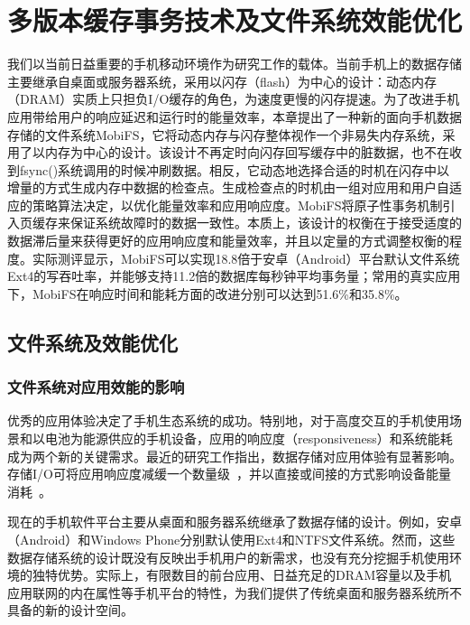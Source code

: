 \chapter{多版本缓存事务技术及文件系统效能优化}
\label{chap:vct}

我们以当前日益重要的手机移动环境作为研究工作的载体。当前手机上的数据存储主要继承自桌面或服务器系统，采用以闪存（flash）为中心的设计：动态内存（DRAM）实质上只担负I/O缓存的角色，为速度更慢的闪存提速。为了改进手机应用带给用户的响应延迟和运行时的能量效率，本章提出了一种新的面向手机数据存储的文件系统MobiFS，它将动态内存与闪存整体视作一个非易失内存系统，采用了以内存为中心的设计。该设计不再定时向闪存回写缓存中的脏数据，也不在收到fsync()系统调用的时候冲刷数据。相反，它动态地选择合适的时机在闪存中以增量的方式生成内存中数据的检查点。生成检查点的时机由一组对应用和用户自适应的策略算法决定，以优化能量效率和应用响应度。MobiFS将原子性事务机制引入页缓存来保证系统故障时的数据一致性。本质上，该设计的权衡在于接受适度的数据滞后量来获得更好的应用响应度和能量效率，并且以定量的方式调整权衡的程度。实际测评显示，MobiFS可以实现18.8倍于安卓（Android）平台默认文件系统Ext4的写吞吐率，并能够支持11.2倍的数据库每秒钟平均事务量；常用的真实应用下，MobiFS在响应时间和能耗方面的改进分别可以达到51.6\%和35.8\%。

\section{文件系统及效能优化}

\subsection{文件系统对应用效能的影响}

优秀的应用体验决定了手机生态系统的成功。特别地，对于高度交互的手机使用场景和以电池为能源供应的手机设备，应用的响应度（responsiveness）和系统能耗成为两个新的关键需求。最近的研究工作指出，数据存储对应用体验有显著影响。存储I/O可将应用响应度减缓一个数量级~\cite{Desnoyers:2013:SRN:2534861.2534867, Kim:RSS:2012,Lee:2012:SLD:2380356.2380367, Nguyen:2014:ISR:2638728.2638841}，并以直接或间接的方式影响设备能量消耗~\cite{Li:2014:EOM:2591305.2591316,Nguyen:2013:SSE:2493432.2493505,
Xu:2013:OBE:2462456.2464444}。

现在的手机软件平台主要从桌面和服务器系统继承了数据存储的设计。例如，安卓（Android）和Windows Phone分别默认使用Ext4和NTFS文件系统。然而，这些数据存储系统的设计既没有反映出手机用户的新需求，也没有充分挖掘手机使用环境的独特优势。实际上，有限数目的前台应用、日益充足的DRAM容量以及手机应用联网的内在属性等手机平台的特性，为我们提供了传统桌面和服务器系统所不具备的新的设计空间。

